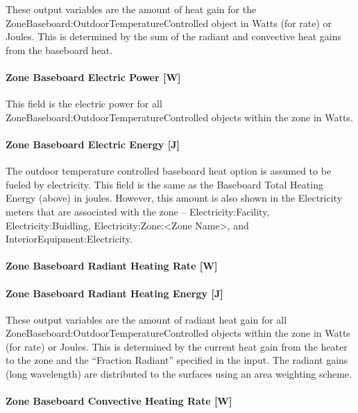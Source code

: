 These output variables are the amount of heat gain for the Zone\-Baseboard:\-Outdoor\-Temperature\-Controlled object in Watts (for rate) or Joules. This is determined by the sum of the radiant and convective heat gains from the baseboard heat.

\paragraph{Zone Baseboard Electric Power {[}W{]}}\label{zone-baseboard-electric-power-w}

This field is the electric power for all Zone\-Baseboard:\-Outdoor\-Temperature\-Controlled objects within the zone in Watts.

\paragraph{Zone Baseboard Electric Energy {[}J{]}}\label{zone-baseboard-electric-energy-j}

The outdoor temperature controlled baseboard heat option is assumed to be fueled by electricity. This field is the same as the Baseboard Total Heating Energy (above) in joules. However, this amount is also shown in the Electricity meters that are associated with the zone -- Electricity:\-Facility, Electricity:\-Buidling, Electricity:\-Zone:\-\textless{}Zone Name\textgreater{}, and Interior\-Equipment:\-Electricity.

\paragraph{Zone Baseboard Radiant Heating Rate {[}W{]}}\label{zone-baseboard-radiant-heating-rate-w}

\paragraph{Zone Baseboard Radiant Heating Energy {[}J{]}}\label{zone-baseboard-radiant-heating-energy-j}

These output variables are the amount of radiant heat gain for all Zone\-Baseboard:\-Outdoor\-Temperature\-Controlled objects within the zone in Watts (for rate) or Joules. This is determined by the current heat gain from the heater to the zone and the ``Fraction Radiant'' specified in the input. The radiant gains (long wavelength) are distributed to the surfaces using an area weighting scheme.

\paragraph{Zone Baseboard Convective Heating Rate {[}W{]}}\label{zone-baseboard-convective-heating-rate-w}

